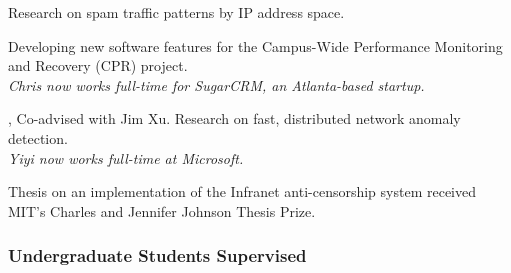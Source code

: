 \begin{description}
{}{Research on spam traffic patterns by IP address space.}

{}{Developing new software features for the Campus-Wide Performance
  Monitoring and Recovery (CPR) project. \\ {\em Chris now works full-time
    for SugarCRM, an Atlanta-based startup.}}

{
,
}{Co-advised with Jim Xu. Research on fast, distributed network anomaly
  detection.\\ {\em Yiyi now works full-time at Microsoft.}}

	{}{Thesis on an implementation of the
	Infranet anti-censorship system received MIT's Charles and
	Jennifer Johnson Thesis Prize.}



\end{description}


\subsubsection{Undergraduate Students Supervised}

